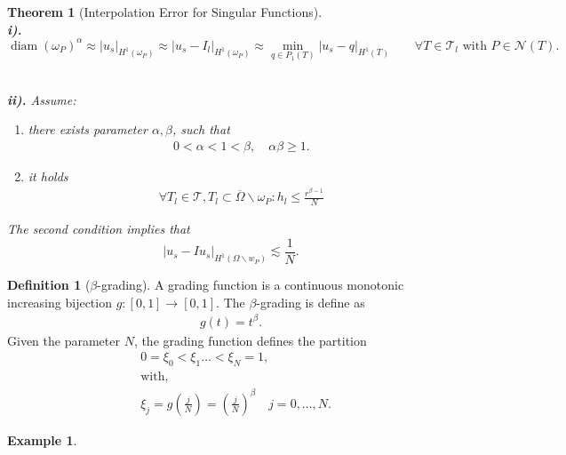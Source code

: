 \documentclass[a4paper,12pt,oneside,fleqn]{book}
\newtheorem{theorem}{Theorem}[section]
\theoremstyle{definition}
\newtheorem{definition}{Definition}[section]
\newtheorem*{example}{Example}
\theoremstyle{remark}
\DeclareMathOperator*{\diam}{diam}
\begin{document}
\begin{theorem}[Interpolation Error for Singular Functions]\quad\\
\textbf{i).}
\begin{equation}
	\diam(\omega_P)^\alpha \approx |u_s|_{H^1(\omega_P)} \approx |u_s - I_l|_{H^1(\omega_P)} \approx \min_{q \in P_1(T)} |u_s - q|_{H^1(T)} \qquad \forall T \in \mathcal{T}_l \text{ with } P \in \mathcal{N}(T).  
\end{equation}

\quad\\
\textbf{ii).} Assume: 
\begin{enumerate}
	\item there exists parameter $\alpha, \beta$, such that
	\begin{align*}
		0 < \alpha < 1 < \beta, \quad \alpha\beta \ge 1.
	\end{align*}
	\item it holds
	\begin{align*}
		\forall T_l \in \mathcal{T}, T_l \subset \overline{\Omega} \backslash \omega_P: h_l \le \frac{r^{\beta - 1}}{N}
	\end{align*}
\end{enumerate}
The second condition implies that 
\begin{equation}
	|u_s - I u_s|_{H^1(\Omega \backslash w_P)} \lesssim \frac{1}{N}.
\end{equation}	
\end{theorem}


\begin{definition}[$\beta$-grading]
	A grading function is a continuous monotonic increasing bijection $g: [0, 1] \rightarrow [0, 1]$. The $\beta$-grading is define as 
	\begin{align*}
		g(t) = t^\beta.
	\end{align*}
	Given the parameter $N$, the grading function defines the partition 
	\begin{align*}
		& 0 = \xi_0< \xi_1 \dots < \xi_N = 1, \\
		& \text{with,}\\
		& \xi_j  = g(\frac{j}{N}) = (\frac{j}{N})^\beta \quad j = 0, \dots, N.
	\end{align*}
\end{definition}

\begin{example}
	
\end{example}
\end{document}
